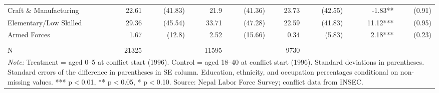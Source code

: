 \begin{landscape}
\begin{table}[!h]
{\begin{tabular}[t]{lrrrrrrrr}
Craft \& Manufacturing & 22.61 & (41.83) & 21.9 & (41.36) & 23.73 & (42.55) & -1.83** & (0.91)\\
\addlinespace
Elementary/Low Skilled & 29.36 & (45.54) & 33.71 & (47.28) & 22.59 & (41.83) & 11.12*** & (0.95)\\
Armed Forces & 1.67 & (12.8) & 2.52 & (15.66) & 0.34 & (5.83) & 2.18*** & (0.23)\\
 &  &  &  &  &  &  &  & \\
N & 21325 &  & 11595 &  & 9730 &  &  & \\
\bottomrule
\multicolumn{9}{l}{\rule{0pt}{1em}\textit{Note: } Treatment = aged 0--5 at conflict start (1996). Control = aged 18--40 at conflict start (1996). Standard deviations in parentheses. Standard errors of the difference in parentheses in SE column. Education, ethnicity, and occupation percentages conditional on non-missing values. *** p$<$0.01, ** p$<$0.05, * p$<$0.10. Source: Nepal Labor Force Survey; conflict data from INSEC.}\\
\end{tabular}}
\end{table}
\end{landscape}
